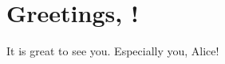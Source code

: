\documentclass{article}
\begin{document}
\section{Greetings, {}!}
It is great to see you.
Especially you, Alice!
\end{document}
